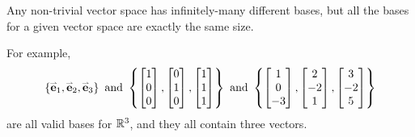 \begin{fact}
  Any non-trivial vector space has infinitely-many different bases, but all
  the bases for a given vector space are exactly the same size.

  \vspace{1em}

  For example,
  \[
    \left\{\mathbf{\accentset{\rightharpoonup}{e}}_1,\mathbf{\accentset{\rightharpoonup}{e}}_2,\mathbf{\accentset{\rightharpoonup}{e}}_3\right\}
      \text{ and }
    \left\{
      \begin{bmatrix}1\\0\\0\end{bmatrix},
      \begin{bmatrix}0\\1\\0\end{bmatrix},
      \begin{bmatrix}1\\1\\1\end{bmatrix}
    \right\}
      \text{ and }
    \left\{
      \begin{bmatrix}1\\0\\-3\end{bmatrix},
      \begin{bmatrix}2\\-2\\1\end{bmatrix},
      \begin{bmatrix}3\\-2\\5\end{bmatrix}
    \right\}
  \]
  are all valid bases for \(\mathbb{R}^3\), and they all contain three vectors.
\end{fact}

